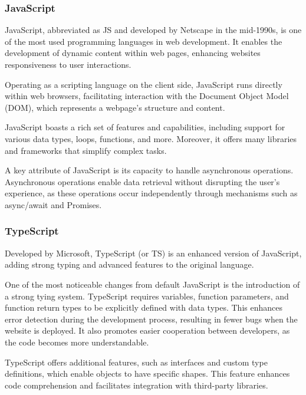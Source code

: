 \documentclass[12pt,oneside,openright,a4paper]{cpe-english-project}
\begin{document}
      \subsubsection{JavaScript}
        \qquad JavaScript, abbreviated as JS and developed by Netscape in the mid-1990s, is one of the most used programming languages in web development. It enables the development of dynamic content within web pages, enhancing websites responsiveness to user interactions.\par
        \qquad Operating as a scripting language on the client side, JavaScript runs directly within web browsers, facilitating interaction with the Document Object Model (DOM), which represents a webpage's structure and content.\par
        \qquad JavaScript boasts a rich set of features and capabilities, including support for various data types, loops, functions, and more. Moreover, it offers many libraries and frameworks that simplify complex tasks.\par
        \qquad A key attribute of JavaScript is its capacity to handle asynchronous operations. Asynchronous operations enable data retrieval without disrupting the user’s experience, as these operations occur independently through mechanisms such as async/await and Promises.\par
      \subsubsection{TypeScript}
        \qquad Developed by Microsoft, TypeScript (or TS) is an enhanced version of JavaScript, adding strong typing and advanced features to the original language.\par
        \qquad One of the most noticeable changes from default JavaScript is the introduction of a strong tying system. TypeScript requires variables, function parameters, and function return types to be explicitly defined with data types. This enhances error detection during the development process, resulting in fewer bugs when the website is deployed. It also promotes easier cooperation between developers, as the code becomes more understandable.\par
        \qquad TypeScript offers additional features, such as interfaces and custom type definitions, which enable objects to have specific shapes. This feature enhances code comprehension and facilitates integration with third-party libraries.\par
      
\end{document}

